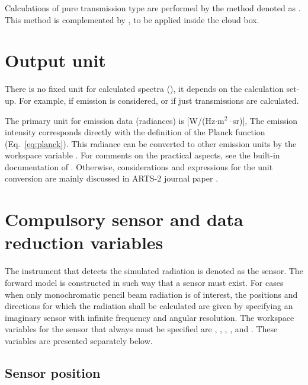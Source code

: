 Calculations of pure transmission type are performed by the method denoted as
. This method is complemented by
, to be applied inside the cloud box.


\section{Output unit}
\label{sec:fm_defs:unit}

There is no fixed unit for calculated spectra (), it depends on the
calculation set-up. For example, if emission is considered, or if just
transmissions are calculated. 

The primary unit for emission data (radiances) is [W/(Hz$\cdot$m$^2\cdot$sr)],
The emission intensity corresponds directly with the definition of the Planck
function (Eq.~\ref{eq:planck}). This radiance can be converted to other
emission units by the workspace variable . For comments on
the practical aspects, see the built-in documentation of .
Otherwise, considerations and expressions for the unit conversion are mainly
discussed in ARTS-2 journal paper \citep[][Sec.~5.7]{eriksson:arts2:11}.



\section{Compulsory sensor and data reduction variables}
\label{sec:fm_defs:sensor1}

The instrument that detects the simulated radiation is denoted as the
sensor. The forward model is constructed in such
way that a sensor must exist. For cases when only monochromatic pencil
beam radiation is of interest, the positions and directions for which
the radiation shall be calculated are given by specifying an imaginary
sensor with infinite frequency and angular resolution. The workspace
variables for the sensor that always must be specified are
, ,
, ,
 and . These
variables are presented separately
below. 


\subsection{Sensor position}
\label{sec:fm_defs:sensorpos}

